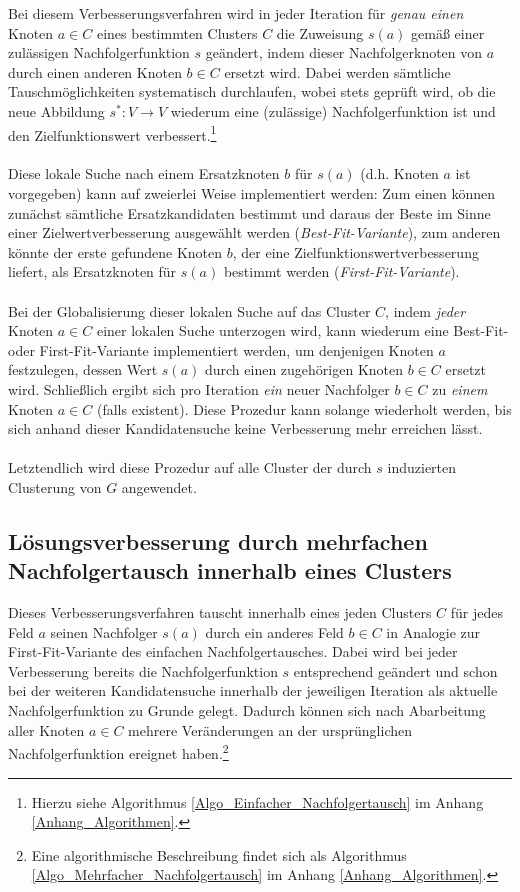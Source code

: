 \documentclass[fontsize=12pt,doubleside,openany,listof=totoc,listof=flat,listof=nochaptergap,numbers=noenddot]{scrbook}
\theoremstyle{style}
\begin{document}
Bei diesem Verbesserungsverfahren wird in jeder Iteration für \textit{genau einen} Knoten $a \in C$ eines bestimmten Clusters $C$ die Zuweisung $s(a)$ gemäß einer zulässigen Nachfolgerfunktion $s$ geändert, indem dieser Nachfolgerknoten von $a$ durch einen anderen Knoten $b \in C$ ersetzt wird. Dabei werden sämtliche Tauschmöglichkeiten systematisch durchlaufen, wobei stets geprüft wird, ob die neue Abbildung $s^*:V\rightarrow V$ wiederum eine (zulässige) Nachfolgerfunktion ist und den Zielfunktionswert verbessert.\footnote{Hierzu siehe Algorithmus \ref{Algo_Einfacher_Nachfolgertausch} im Anhang \ref{Anhang_Algorithmen}.}\\
\\
Diese lokale Suche nach einem \glqq Ersatzknoten\grqq{} $b$ für $s(a)$ (d.h. Knoten $a$ ist vorgegeben) kann auf zweierlei Weise implementiert werden: Zum einen können zunächst sämtliche \glqq Ersatzkandidaten\grqq{} bestimmt und daraus der Beste im Sinne einer Zielwertverbesserung ausgewählt werden (\textit{Best-Fit-Variante}), zum anderen könnte der erste gefundene Knoten $b$, der eine Zielfunktionswertverbesserung liefert, als Ersatzknoten für $s(a)$ bestimmt werden (\textit{First-Fit-Variante}). \\
\\
Bei der \glqq Globalisierung\grqq{} dieser lokalen Suche auf das Cluster $C$, indem \textit{jeder} Knoten $a \in C$ einer lokalen Suche unterzogen wird, kann wiederum eine Best-Fit- oder First-Fit-Variante implementiert werden, um denjenigen Knoten $a$ festzulegen, dessen Wert $s(a)$ durch einen zugehörigen Knoten $b \in C$ ersetzt wird. Schließlich ergibt sich pro Iteration \textit{ein} neuer Nachfolger $b \in C$ zu \textit{einem} Knoten $a \in C$ (falls existent). Diese Prozedur kann solange wiederholt werden, bis sich anhand dieser Kandidatensuche keine Verbesserung mehr erreichen lässt. \\
\\
Letztendlich wird diese Prozedur auf alle Cluster der durch $s$ induzierten Clusterung von $G$ angewendet. 



\subsection{Lösungsverbesserung durch mehrfachen Nachfolgertausch innerhalb eines Clusters}
\label{subsectionMehrfacherNachfolgertausch}
Dieses Verbesserungsverfahren tauscht innerhalb eines jeden Clusters $C$ für jedes Feld $a$ seinen Nachfolger $s(a)$ durch ein anderes Feld $b \in C$ in Analogie zur First-Fit-Variante des einfachen Nachfolgertausches. Dabei wird bei jeder Verbesserung bereits die Nachfolgerfunktion $s$ entsprechend geändert und schon bei der weiteren Kandidatensuche innerhalb der jeweiligen Iteration als aktuelle Nachfolgerfunktion zu Grunde gelegt. Dadurch können sich nach Abarbeitung aller Knoten $a \in C$ mehrere Veränderungen an der ursprünglichen Nachfolgerfunktion ereignet haben.\footnote{Eine algorithmische Beschreibung findet sich als Algorithmus \ref{Algo_Mehrfacher_Nachfolgertausch} im Anhang \ref{Anhang_Algorithmen}.}
\end{document}
